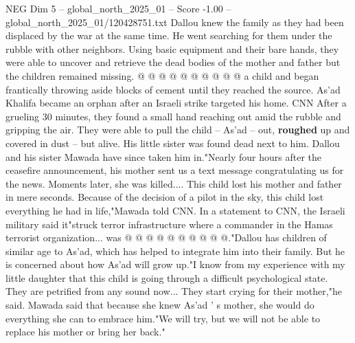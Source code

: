 \begin{textsample}{NEG Dim 5 – global\_north\_2025\_01 – Score -1.00 – global\_north\_2025\_01/120428751.txt}
Dallou knew the family as they had been displaced by the war at the same time.
He went searching for them under the rubble with other neighbors.
Using basic equipment and their bare hands, they were able to uncover and retrieve the dead bodies of the mother and father but the children remained missing. @ @ @ @ @ @ @ @ @ @ a child and began frantically throwing aside blocks of cement until they reached the source.
As'ad Khalifa became an orphan after an Israeli strike targeted his home.
CNN After a grueling 30 minutes, they found a small hand reaching out amid the rubble and gripping the air.
They were able to pull the child -- As'ad -- out, \textbf{roughed} up and covered in dust -- but alive.
His little sister was found dead next to him.
Dallou and his sister Mawada have since taken him in."Nearly four hours after the ceasefire announcement, his mother sent us a text message congratulating us for the news.
Moments later, she was killed....
This child lost his mother and father in mere seconds.
Because of the decision of a pilot in the sky, this child lost everything he had in life,"Mawada told CNN.
In a statement to CNN, the Israeli military said it"struck terror infrastructure where a commander in the Hamas terrorist organization... was @ @ @ @ @ @ @ @ @ @."Dallou has children of similar age to As'ad, which has helped to integrate him into their family.
But he is concerned about how As'ad will grow up."I know from my experience with my little daughter that this child is going through a difficult psychological state.
They are petrified from any sound now...
They start crying for their mother,"he said.
Mawada said that because she knew As'ad ' s mother, she would do everything she can to embrace him."We will try, but we will not be able to replace his mother or bring her back."

\end{textsample}
